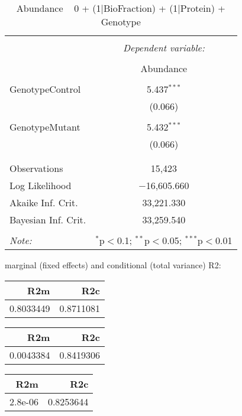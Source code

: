 \documentclass[11pt]{report}
\begin{document}
\begin{table}[!htbp] \centering 
  \caption{Abundance ~ 0 + (1|BioFraction) + (1|Protein) + Genotype} 
  \label{} 
\begin{tabular}{@{\extracolsep{5pt}}lc} 
\\[-1.8ex]\hline 
\hline \\[-1.8ex] 
 & \multicolumn{1}{c}{\textit{Dependent variable:}} \\ 
\cline{2-2} 
\\[-1.8ex] & Abundance \\ 
\hline \\[-1.8ex] 
 GenotypeControl & 5.437$^{***}$ \\ 
  & (0.066) \\ 
  & \\ 
 GenotypeMutant & 5.432$^{***}$ \\ 
  & (0.066) \\ 
  & \\ 
\hline \\[-1.8ex] 
Observations & 15,423 \\ 
Log Likelihood & $-$16,605.660 \\ 
Akaike Inf. Crit. & 33,221.330 \\ 
Bayesian Inf. Crit. & 33,259.540 \\ 
\hline 
\hline \\[-1.8ex] 
\textit{Note:}  & \multicolumn{1}{r}{$^{*}$p$<$0.1; $^{**}$p$<$0.05; $^{***}$p$<$0.01} \\ 
\end{tabular} 
\end{table} 
marginal (fixed effects) and conditional (total variance) R2:

\begin{tabular}{r|r}
\hline
R2m & R2c\\
\hline
0.8033449 & 0.8711081\\
\hline
\end{tabular}

\begin{tabular}{r|r}
\hline
R2m & R2c\\
\hline
0.0043384 & 0.8419306\\
\hline
\end{tabular}

\begin{tabular}{r|r}
\hline
R2m & R2c\\
\hline
2.8e-06 & 0.8253644\\
\hline
\end{tabular}
\end{document}
